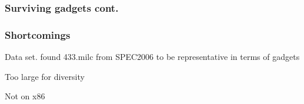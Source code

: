 \begin{frame}
	\frametitle{Surviving gadgets cont.}


\end{frame}

\begin{frame}
	\frametitle{Shortcomings}

	Data set. \textcite{large-scale-automated} found 433.milc from SPEC2006 to be representative
	in terms of gadgets

	\vspace{0.5cm}

	Too large for diversity

	\vspace{0.5cm}

	Not on x86

\end{frame}
